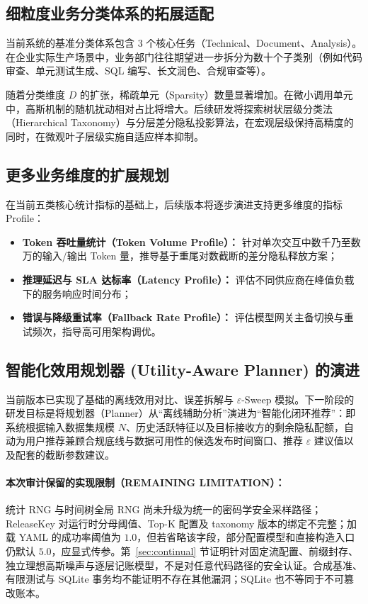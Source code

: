 \subsection{细粒度业务分类体系的拓展适配}
当前系统的基准分类体系包含 3 个核心任务（Technical、Document、Analysis）。在企业实际生产场景中，业务部门往往期望进一步拆分为数十个子类别（例如代码审查、单元测试生成、SQL 编写、长文润色、合规审查等）。

随着分类维度 $D$ 的扩张，稀疏单元（Sparsity）数量显著增加。在微小调用单元中，高斯机制的随机扰动相对占比将增大。后续研发将探索树状层级分类法（Hierarchical Taxonomy）与分层差分隐私投影算法，在宏观层级保持高精度的同时，在微观叶子层级实施自适应样本抑制。

\subsection{更多业务维度的扩展规划}
在当前五类核心统计指标的基础上，后续版本将逐步演进支持更多维度的指标 Profile：
\begin{itemize}[leftmargin=2em]
  \item \textbf{Token 吞吐量统计（Token Volume Profile）：} 针对单次交互中数千乃至数万的输入/输出 Token 量，推导基于重尾对数截断的差分隐私释放方案；
  \item \textbf{推理延迟与 SLA 达标率（Latency Profile）：} 评估不同供应商在峰值负载下的服务响应时间分布；
  \item \textbf{错误与降级重试率（Fallback Rate Profile）：} 评估模型网关主备切换与重试频次，指导高可用架构调优。
\end{itemize}

\subsection{智能化效用规划器 (Utility-Aware Planner) 的演进}
当前版本已实现了基础的离线效用对比、误差拆解与 $\varepsilon$-Sweep 模拟。下一阶段的研发目标是将规划器（Planner）从“离线辅助分析”演进为“智能化闭环推荐”：即系统根据输入数据集规模 $N$、历史活跃特征以及目标接收方的剩余隐私配额，自动为用户推荐兼顾合规底线与数据可用性的候选发布时间窗口、推荐 $\varepsilon$ 建议值以及配套的截断参数建议。

\paragraph{本次审计保留的实现限制（REMAINING LIMITATION）：}统计 RNG 与时间树全局 RNG 尚未升级为统一的密码学安全采样路径；ReleaseKey 对运行时分母阈值、Top-K 配置及 taxonomy 版本的绑定不完整；加载 YAML 的成功率阈值为 $1.0$，但若省略该字段，部分配置模型和直接构造入口仍默认 $5.0$，应显式传参。第~\ref{sec:continual} 节证明针对固定流配置、前缀封存、独立理想高斯噪声与逐层记账模型，不是对任意代码路径的安全认证。合成基准、有限测试与 SQLite 事务均不能证明不存在其他漏洞；SQLite 也不等同于不可篡改账本。
